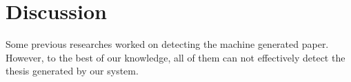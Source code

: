 \chapter{Discussion} \label{chapter:discussion}

Some previous researches\cite{xiong2009effective} worked on detecting the machine generated paper. However, to the best of our knowledge, all of them can not effectively detect the thesis generated by our system.